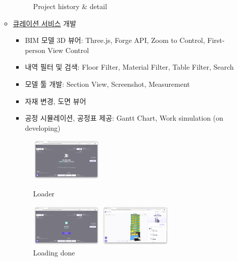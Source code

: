 \begin{itemize}
\begin{itemize}[label=$\star$]
\begin{figure}[!ht]
\begin{fullwidth}
{					            \caption*{Project history \& detail}
				            }
			            \end{fullwidth}
		            \end{figure}
		            \clearpage
		      \item \href{https://curation.builderhub.io/project/tester}{큐레이션 서비스} 개발
		            \begin{itemize}
			            \item BIM 모델 3D 뷰어: Three.js, Forge API, Zoom to Control, First-person View Control
			            \item 내역 필터 및 검색: Floor Filter, Material Filter, Table Filter, Search
			            \item 모델 툴 개발: Section View, Screenshot, Measurement
			            \item 자재 변경, 도면 뷰어
			            \item 공정 시뮬레이션, 공정표 제공: Gantt Chart, Work simulation (on developing)
		            \end{itemize}
		            \begin{figure}[!ht]
			            \begin{fullwidth}
				            \parbox{0.35\textwidth}{
					            \centering
					            \includegraphics[width=0.35\textwidth]{images/builderhub-curation-loader-1.png}
					            \caption*{Loader}
				            }\qquad
				            \parbox{0.35\textwidth}{
					            \centering
					            \includegraphics[width=0.35\textwidth]{images/builderhub-curation-loader-2.png}
					            \caption*{Loading done}
				            }\qquad
				            \parbox{0.35\textwidth}{
					            \centering
					            \includegraphics[width=0.35\textwidth]{images/builderhub-curation-main.png}
}
\end{fullwidth}
\end{figure}
\end{itemize}
\end{itemize}
